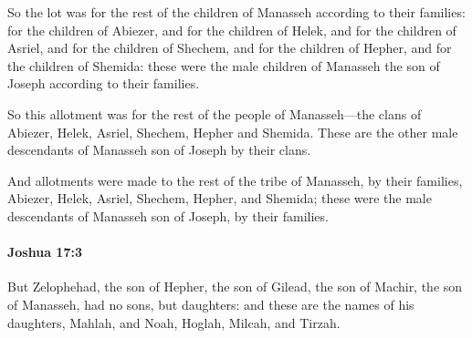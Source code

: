 			\begin{versebox}
					\item[BHS] 
					\item[ASV] So the lot was for the rest of the children of Manasseh according to their families: for the children of Abiezer, and for the children of Helek, and for the children of Asriel, and for the children of Shechem, and for the children of Hepher, and for the children of Shemida: these were the male children of Manasseh the son of Joseph according to their families.
					\item[NIV] So this allotment was for the rest of the people of Manasseh—the clans of Abiezer, Helek, Asriel, Shechem, Hepher and Shemida. These are the other male descendants of Manasseh son of Joseph by their clans.
					\item[NRSV] And allotments were made to the rest of the tribe of Manasseh, by their families, Abiezer, Helek, Asriel, Shechem, Hepher, and Shemida; these were the male descendants of Manasseh son of Joseph, by their families.
			\end{versebox}

		\paragraph{Joshua 17:3} %
			\label{JOSHUA-17-3}

			But Zelophehad, the son of Hepher, the son of Gilead, the son of Machir, the son of Manasseh, had no sons, but daughters: and these are the names of his daughters, Mahlah, and Noah, Hoglah, Milcah, and Tirzah.

